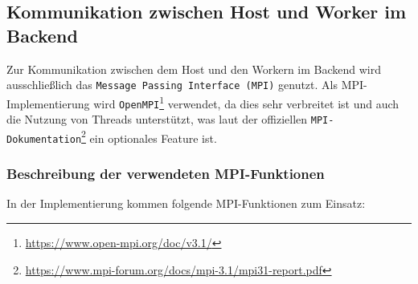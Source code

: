 \subsection{Kommunikation zwischen Host und Worker im Backend}

Zur Kommunikation zwischen dem Host und den Workern im Backend wird ausschließlich das \verb|Message Passing Interface (MPI)| genutzt. Als MPI-Implementierung wird \verb|OpenMPI|\footnote{\url{https://www.open-mpi.org/doc/v3.1/}} verwendet, da dies sehr verbreitet ist und auch die Nutzung von Threads unterstützt, was laut der offiziellen \verb|MPI-Dokumentation|\footnote{\url{https://www.mpi-forum.org/docs/mpi-3.1/mpi31-report.pdf}} ein optionales Feature ist.

\subsubsection{Beschreibung der verwendeten MPI-Funktionen}

In der Implementierung kommen folgende MPI-Funktionen zum Einsatz:

